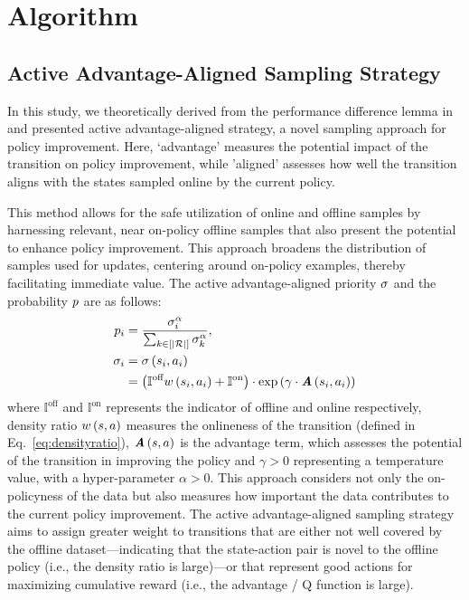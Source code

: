 \section{Algorithm}








\subsection{{Active} Advantage-Aligned Sampling Strategy}
In this study, we theoretically derived from the performance difference lemma in  and presented active advantage-aligned strategy, a novel sampling approach for policy improvement. Here, `advantage' measures the potential impact of the transition on policy improvement, while 'aligned' assesses how well the transition aligns with the states sampled online by the current policy.

This method allows for the safe utilization of online and offline samples by harnessing relevant, near on-policy offline samples that also present the potential to enhance policy improvement. 
This approach broadens the distribution of samples used for updates, centering around on-policy examples, thereby facilitating immediate value. The active advantage-aligned priority ${\sigma}$ and the probability ${p}$ are as follows:
\begin{align}\label{eq:adv_priority}
\prob_i&=\frac{\sigma_i^{\alpha}}{\sum_{k\in\bracket{|\ReplayBuffer|}}\sigma_k^{\alpha}},\\ 
\priority_i&=\priority\paren{\state_i,\action_i} \nonumber \\ &=\paren{\mathbb{I}^{\text{off}}\density
\paren{\state_i,\action_i}+ \mathbb{I}^{\text{on}}} \cdot\exp\paren{\gamma\cdot\AFunc\paren{\state_i,\action_i}} %
\end{align}
where $\mathbb{I}^{\text{off}}$ and $\mathbb{I}^{\text{on}}$ represents the indicator of offline and online respectively, density ratio
${w} \left( {s,a} \right) $ %
measures the onlineness of the transition (defined in Eq.~\eqref{eq:densityratio}), $\textbf{\em A} \left( {s,a} \right) $ is the advantage term, which assesses the potential of the transition in improving the policy and $\gamma > 0$ representing a temperature value, with a hyper-parameter $\alpha>0$.
This approach considers not only the on-policyness of the data but also measures how important the data contributes to the current policy improvement. 
The active advantage-aligned sampling strategy aims to assign greater weight to transitions that are either not well covered by the offline dataset—indicating that the state-action pair is novel to the offline policy (i.e., the density ratio is large)—or that represent good actions for maximizing cumulative reward (i.e., the advantage / Q function is large).








